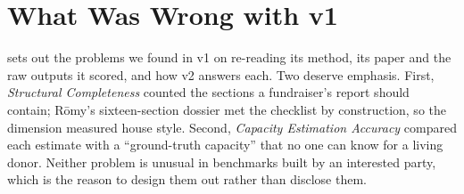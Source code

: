 \documentclass[11pt,a4paper]{article}
\newcommand{\romy}{R\={o}my}
\begin{document}
\section{What Was Wrong with v1}
\label{sec:v1}

 sets out the problems we found in v1 on re-reading its method, its paper and the raw outputs it scored, and how v2 answers each. Two deserve emphasis. First, \emph{Structural Completeness} counted the sections a fundraiser's report should contain; \romy's sixteen-section dossier met the checklist by construction, so the dimension measured house style. Second, \emph{Capacity Estimation Accuracy} compared each estimate with a ``ground-truth capacity'' that no one can know for a living donor. Neither problem is unusual in benchmarks built by an interested party, which is the reason to design them out rather than disclose them.
\end{document}
